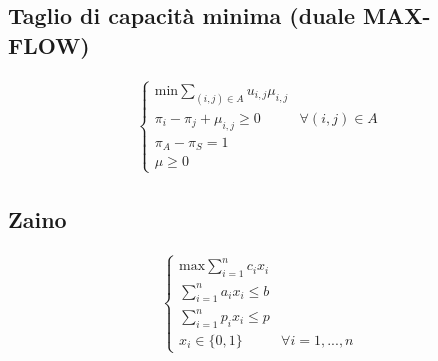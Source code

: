 \documentclass[fleqn,12pt]{article}
\begin{document}
\subsection{Taglio di capacità minima (duale MAX-FLOW)}
    \begin{gather*}
    \begin{cases}
        \text{min} \sum\limits_{(i,j) \in A} u_{i,j} \mu_{i,j} \\
        \pi_i - \pi_j + \mu_{i,j} \ge 0 & \forall (i,j) \in A \\
        \pi_A - \pi_S = 1 \\
        \mu \ge 0
    \end{cases}
    \end{gather*}
\subsection{Zaino}
    \begin{gather*}
    \begin{cases}
        \text{max} \sum\limits_{i=1}^n c_ix_i \\
        \sum\limits_{i=1}^n a_ix_i \le b \\
        \sum\limits_{i=1}^n p_ix_i \le p \\
        x_i \in \{0,1\} & \forall i = 1,...,n
    \end{cases}
    \end{gather*}
\end{document}
